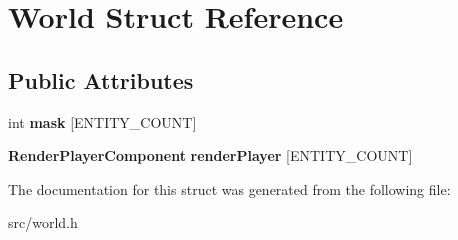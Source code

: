 \section{\-World \-Struct \-Reference}
\label{struct_world}
\subsection*{\-Public \-Attributes}
\begin{DoxyCompactItemize}
\item 
int {\bfseries mask} [\-E\-N\-T\-I\-T\-Y\-\_\-\-C\-O\-U\-N\-T]\label{struct_world_a0ee8582ba128d275cae029c51b8e33fb}

\item 
{\bf \-Render\-Player\-Component} {\bfseries render\-Player} [\-E\-N\-T\-I\-T\-Y\-\_\-\-C\-O\-U\-N\-T]\label{struct_world_ab68cc45c2b187f214ae3cd732e293d90}

\end{DoxyCompactItemize}


\-The documentation for this struct was generated from the following file\-:\begin{DoxyCompactItemize}
\item 
src/world.\-h\end{DoxyCompactItemize}
